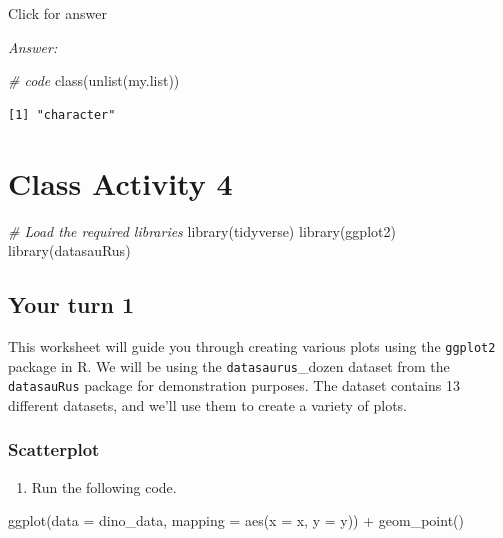 \documentclass[
]{book}
\newenvironment{Shaded}{\begin{snugshade}}{\end{snugshade}}
\newcommand{\AttributeTok}[1]{\textcolor[rgb]{0.77,0.63,0.00}{#1}}
\newcommand{\CommentTok}[1]{\textcolor[rgb]{0.56,0.35,0.01}{\textit{#1}}}
\newcommand{\FunctionTok}[1]{\textcolor[rgb]{0.00,0.00,0.00}{#1}}
\newcommand{\NormalTok}[1]{#1}
\newcommand{\SpecialCharTok}[1]{\textcolor[rgb]{0.00,0.00,0.00}{#1}}
\providecommand{\tightlist}{%
  \setlength{\itemsep}{0pt}\setlength{\parskip}{0pt}}
\begin{document}
Click for answer

\emph{Answer:}

\begin{Shaded}
\begin{Highlighting}[]
\CommentTok{\# code}
\FunctionTok{class}\NormalTok{(}\FunctionTok{unlist}\NormalTok{(my.list))}
\end{Highlighting}
\end{Shaded}

\begin{verbatim}
[1] "character"
\end{verbatim}

\hypertarget{class-activity-4}{%
\chapter{Class Activity 4}\label{class-activity-4}}

\begin{Shaded}
\begin{Highlighting}[]
\CommentTok{\# Load the required libraries}
\FunctionTok{library}\NormalTok{(tidyverse)}
\FunctionTok{library}\NormalTok{(ggplot2)}
\FunctionTok{library}\NormalTok{(datasauRus)}
\end{Highlighting}
\end{Shaded}

\hypertarget{your-turn-1}{%
\section{Your turn 1}\label{your-turn-1}}

This worksheet will guide you through creating various plots using the \texttt{ggplot2} package in R. We will be using the \texttt{datasaurus}\_dozen dataset from the \texttt{datasauRus} package for demonstration purposes. The dataset contains 13 different datasets, and we'll use them to create a variety of plots.

\hypertarget{scatterplot}{%
\subsection{Scatterplot}\label{scatterplot}}

\begin{enumerate}
\def\labelenumi{\alph{enumi}.}
\tightlist
\item
  Run the following code.
\end{enumerate}

\begin{Shaded}
\begin{Highlighting}[]
\FunctionTok{ggplot}\NormalTok{(}\AttributeTok{data =}\NormalTok{ dino\_data, }\AttributeTok{mapping =} \FunctionTok{aes}\NormalTok{(}\AttributeTok{x =}\NormalTok{ x, }\AttributeTok{y =}\NormalTok{ y)) }\SpecialCharTok{+}
  \FunctionTok{geom\_point}\NormalTok{()}
\end{Highlighting}
\end{Shaded}
\end{document}
